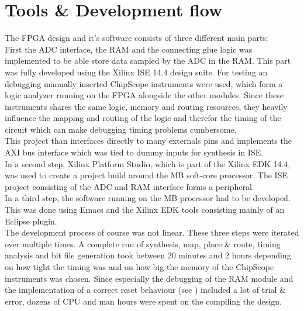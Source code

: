 \section{Tools \& Development flow}
\label{sec:fpga_tools}

The \gls{FPGA} design and it's software consists of three different
main parts: \\

First the \gls{ADC} interface, the \gls{RAM} and the connecting
glue logic was implemented to be able store data sampled by the \gls{ADC}
in the \gls{RAM}. This part was fully developed using the Xilinx ISE 14.4
design suite. For testing an debugging manually inserted ChipScope
instruments were used, which form a logic analyzer running on the \gls{FPGA}
alongside the other modules. Since these instruments shares the same logic,
memory and routing resources, they heavily influence the mapping and routing
of the logic and therefor the timing of the circuit which can make debugging
timing problems cumbersome. \\
This project than interfaces directly to many externals pins and implements
the \gls{AXI} bus interface which was tied to dummy inputs for synthesis in ISE.
\\

In a second step, Xilinx Platform Studio, which is part of the Xilinx
\gls{EDK} 14.4, was used to create a project build around the \acrfull{MB}
soft-core processor. The ISE project consisting of the \gls{ADC} and \gls{RAM}
interface forms a peripheral. \\

In a third step, the software running on the \gls{MB} processor had to be
developed. This was done using Emacs and the Xilinx \gls{EDK} tools
consisting mainly of an Eclipse plugin. \\

The development process of course was not linear. These three steps were
iterated over multiple times. A complete run of synthesis, map,
place \& route, timing analysis and bit file generation
took between 20 minutes and 2 hours depending on how tight the timing was
and on how big the memory of the ChipScope instruments was chosen.
Since especially the debugging of the \gls{RAM} module and the implementation of
a correct reset behaviour (see ) included a lot of
trial \& error, dozens of \acrshort{CPU} and man hours were spent on the
compiling the design.

